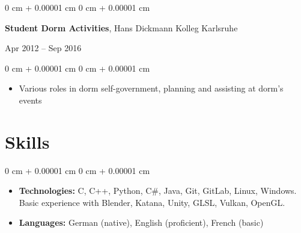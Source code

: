 \documentclass[10pt, letterpaper]{article}
\newenvironment{highlights}{
    \begin{itemize}[
        topsep=0.10 cm,
        parsep=0.10 cm,
        partopsep=0pt,
        itemsep=0pt,
        leftmargin=0 cm + 10pt
    ]
}{
    \end{itemize}
} %
\newenvironment{onecolentry}{
    \begin{adjustwidth}{
        0 cm + 0.00001 cm
    }{
        0 cm + 0.00001 cm
    }
}{
    \end{adjustwidth}
} %
\newenvironment{twocolentry}[2][]{
    \onecolentry
    \def\secondColumn{#2}
    \setcolumnwidth{\fill, 4.5 cm}
    \begin{paracol}{2}
}{
    \switchcolumn \raggedleft \secondColumn
    \end{paracol}
    \endonecolentry
} %
\begin{document}
        \expspace

        \begin{twocolentry}{
            Apr 2012 – Sep 2016
        }
            \textbf{Student Dorm Activities}, Hans Dickmann Kolleg Karlsruhe
            
            \end{twocolentry}
                  \begin{onecolentry}
            \begin{highlights}
                \item Various roles in dorm self-government, planning and assisting at dorm's events
            \end{highlights}
        \end{onecolentry}
    

    \sectionspace
    \section{Skills}
    \sectspacetop
    \begin{onecolentry}
            \begin{highlights}
                \item \textbf{Technologies:} C, C++, Python, C\#, Java, Git, GitLab, Linux, Windows.\\
                 Basic experience with Blender, Katana, Unity, GLSL, Vulkan, OpenGL.
                 \expspace
                \item \textbf{Languages:} German (native), English (proficient), French (basic)
            \end{highlights}
        \end{onecolentry}
    
\newcommand{\vspacepubl}{\expspace}    
\end{document}
